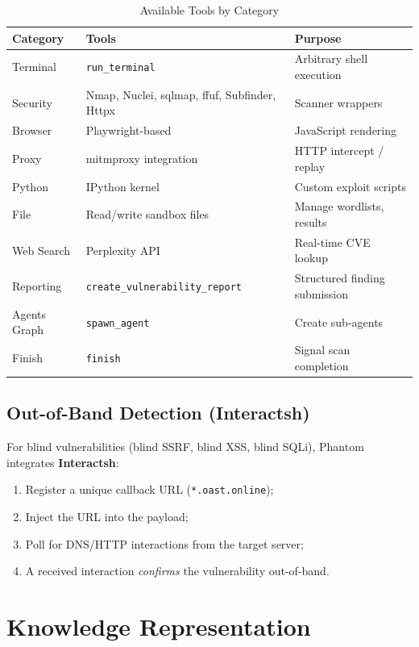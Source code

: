 \documentclass[12pt,a4paper]{article}
\begin{document}
\begin{table}[H]
\centering
\caption{Available Tools by Category}
\begin{tabular}{lll}
\toprule
\textbf{Category} & \textbf{Tools} & \textbf{Purpose} \\
\midrule
Terminal & \texttt{run\_terminal} & Arbitrary shell execution \\
Security & Nmap, Nuclei, sqlmap, ffuf, Subfinder, Httpx & Scanner wrappers \\
Browser & Playwright-based & JavaScript rendering \\
Proxy & mitmproxy integration & HTTP intercept / replay \\
Python & IPython kernel & Custom exploit scripts \\
File & Read/write sandbox files & Manage wordlists, results \\
Web Search & Perplexity API & Real-time CVE lookup \\
Reporting & \texttt{create\_vulnerability\_report} & Structured finding submission \\
Agents Graph & \texttt{spawn\_agent} & Create sub-agents \\
Finish & \texttt{finish} & Signal scan completion \\
\bottomrule
\end{tabular}
\end{table}

\subsection{Out-of-Band Detection (Interactsh)}

For blind vulnerabilities (blind SSRF, blind XSS, blind SQLi), Phantom integrates \textbf{Interactsh}:

\begin{enumerate}
  \item Register a unique callback URL (\texttt{*.oast.online});
  \item Inject the URL into the payload;
  \item Poll for DNS/HTTP interactions from the target server;
  \item A received interaction \emph{confirms} the vulnerability out-of-band.
\end{enumerate}



\section{Knowledge Representation}
\end{document}
